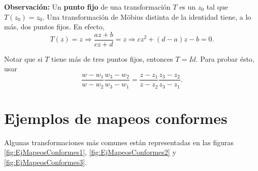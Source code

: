 \newpage
\textbf{Observación:} Un \textbf{punto fijo} de una transformación $T$ es un $z_0$ tal que $T(z_0) = z_0$. Una transformación de Möbius distinta de la identidad tiene, a lo más, dos puntos fijos. En efecto,
    $$T(z) = z \Rightarrow \frac{az+b}{cz+d} = z \Rightarrow cz^2 + (d-a) z - b = 0.$$
    
    Notar que si $T$ tiene más de tres puntos fijos, entonces $T = Id$. Para probar ésto, usar
    $$\frac{w-w_1}{w-w_2} \frac{w_3-w_2}{w_3-w_1} = \frac{z-z_1}{z-z_2} \frac{z_3 - z_2}{z_3 - z_1}.$$

\section{Ejemplos de mapeos conformes}

Algunas transformaciones más comunes están representadas en las figuras \ref{fig:EjMapeosConformes1}, \ref{fig:EjMapeosConformes2} y \ref{fig:EjMapeosConformes3}.


